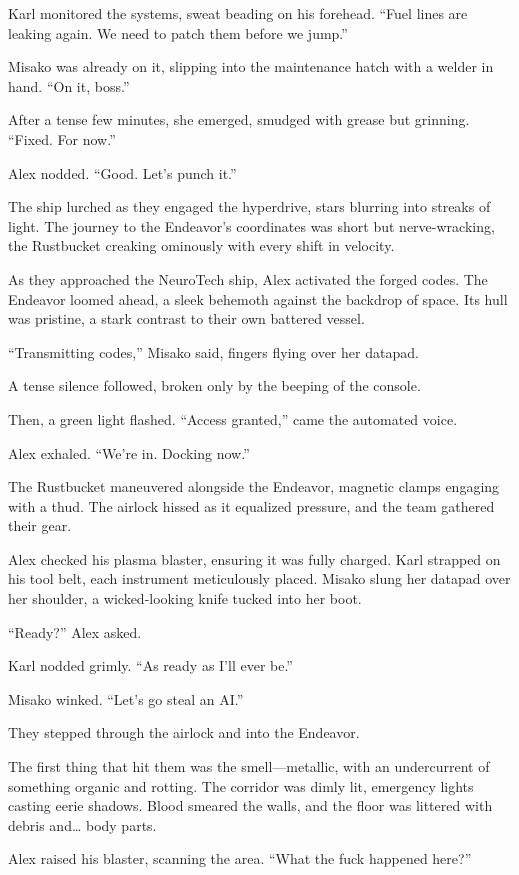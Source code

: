 \documentclass[12pt]{book}
\begin{document}
Karl monitored the systems, sweat beading on his forehead. “Fuel lines are leaking again. We need to patch them before we jump.”

Misako was already on it, slipping into the maintenance hatch with a welder in hand. “On it, boss.”

After a tense few minutes, she emerged, smudged with grease but grinning. “Fixed. For now.”

Alex nodded. “Good. Let’s punch it.”

The ship lurched as they engaged the hyperdrive, stars blurring into streaks of light. The journey to the Endeavor’s coordinates was short but nerve-wracking, the Rustbucket creaking ominously with every shift in velocity.

As they approached the NeuroTech ship, Alex activated the forged codes. The Endeavor loomed ahead, a sleek behemoth against the backdrop of space. Its hull was pristine, a stark contrast to their own battered vessel.

“Transmitting codes,” Misako said, fingers flying over her datapad.

A tense silence followed, broken only by the beeping of the console.

Then, a green light flashed. “Access granted,” came the automated voice.

Alex exhaled. “We’re in. Docking now.”

The Rustbucket maneuvered alongside the Endeavor, magnetic clamps engaging with a thud. The airlock hissed as it equalized pressure, and the team gathered their gear.

Alex checked his plasma blaster, ensuring it was fully charged. Karl strapped on his tool belt, each instrument meticulously placed. Misako slung her datapad over her shoulder, a wicked-looking knife tucked into her boot.

“Ready?” Alex asked.

Karl nodded grimly. “As ready as I’ll ever be.”

Misako winked. “Let’s go steal an AI.”

They stepped through the airlock and into the Endeavor.

The first thing that hit them was the smell—metallic, with an undercurrent of something organic and rotting. The corridor was dimly lit, emergency lights casting eerie shadows. Blood smeared the walls, and the floor was littered with debris and… body parts.

Alex raised his blaster, scanning the area. “What the fuck happened here?”
\end{document}
